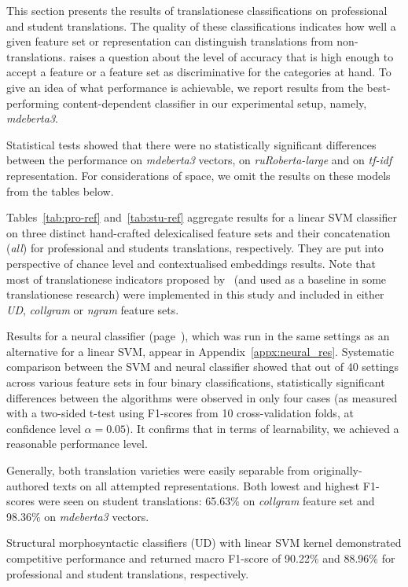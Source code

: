 This section presents the results of translationese classifications on professional and student translations. The quality of these classifications indicates how well a given feature set or representation can distinguish translations from non-translations. \citet{Hu2021} raises a question about the level of accuracy that is high enough to accept a feature or a feature set as discriminative for the categories at hand. To give an idea of what performance is achievable, we report results from the best-performing content-dependent classifier in our experimental setup, namely, \textit{mdeberta3}.
 
Statistical tests showed that there were no statistically significant differences between the performance on \textit{mdeberta3} vectors, on \textit{ruRoberta-large} and on \textit{tf-idf} representation. For considerations of space, we omit the results on these models from the tables below.

Tables~\ref{tab:pro-ref} and~\ref{tab:stu-ref} aggregate results for a linear SVM classifier on three distinct hand-crafted delexicalised feature sets and their concatenation (\textit{all}) for professional and students translations, respectively. They are put into perspective of chance level and contextualised embeddings results. Note that most of translationese indicators proposed by~\citet{Volansky2015} (and used as a baseline in some translationese research) were implemented in this study and included in either \textit{UD}, \textit{collgram} or \textit{ngram} feature sets.  

Results for a neural classifier (page~\pageref{pg:neural}), which was run in the same settings as an alternative for a linear SVM, appear in Appendix~\ref{appx:neural_res}. Systematic comparison between the SVM and neural classifier showed that out of 40 settings across various feature sets in four binary classifications, statistically significant differences between the algorithms were observed in only four cases (as measured with a two-sided t-test using F1-scores from 10 cross-validation folds, at confidence level $\alpha=0.05$). It confirms that in terms of learnability, we achieved a reasonable performance level. 

Generally, both translation varieties were easily separable from originally-authored texts on all attempted representations. Both lowest and highest F1-scores were seen on student translations: 65.63\% on \textit{collgram} feature set and 98.36\% on \textit{mdeberta3} vectors. 

Structural morphosyntactic classifiers (UD) with linear SVM kernel demonstrated competitive performance and returned macro F1-score of 90.22\% and 88.96\% for professional and student translations, respectively.

